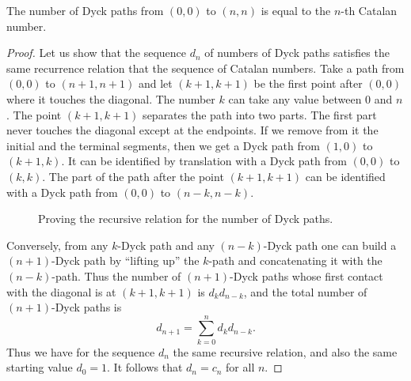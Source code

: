 \begin{page}
\setcounter{section}{4}
\setcounter{subsection}{5}
\setcounter{dfn}{8}
\label{portion:996}

\begin{thm}
The number of Dyck paths from $(0,0)$ to $(n,n)$ is equal to the $n$-th Catalan number.
\end{thm}

\end{page}

\begin{page}
\setcounter{section}{4}
\setcounter{subsection}{5}
\setcounter{dfn}{8}
\label{portion:997}

\begin{proof}
Let us show that the sequence $d_n$ of numbers of Dyck paths satisfies the same recurrence relation that the sequence of Catalan numbers.
Take a path from $(0,0)$ to $(n+1,n+1)$ and let $(k+1,k+1)$ be the first point after $(0,0)$ where it touches the diagonal.
The number $k$ can take any value between $0$ and $n$.
The point $(k+1,k+1)$ separates the path into two parts.
The first part never touches the diagonal except at the endpoints.
If we remove from it the initial and the terminal segments, then we get a Dyck path from $(1,0)$ to $(k+1,k)$.
It can be identified by translation with a Dyck path from $(0,0)$ to $(k,k)$.
The part of the path after the point $(k+1,k+1)$ can be identified with a Dyck path from $(0,0)$ to $(n-k,n-k)$.

\begin{figure}[ht]
\begin{center}

\end{center}
\caption{Proving the recursive relation for the number of Dyck paths.}
\label{fig:DyckInduction}
\end{figure}

Conversely, from any $k$-Dyck path and any $(n-k)$-Dyck path one can build a $(n+1)$-Dyck path
by ``lifting up'' the $k$-path and concatenating it with the $(n-k)$-path.
Thus the number of $(n+1)$-Dyck paths whose first contact with the diagonal is at $(k+1, k+1)$ is $d_k d_{n-k}$,
and the total number of $(n+1)$-Dyck paths is
\[
d_{n+1} = \sum_{k=0}^n d_k d_{n-k}.
\]
Thus we have for the sequence $d_n$ the same recursive relation, and also the same starting value $d_0 = 1$.
It follows that $d_n = c_n$ for all $n$.
\end{proof}


\end{page}
